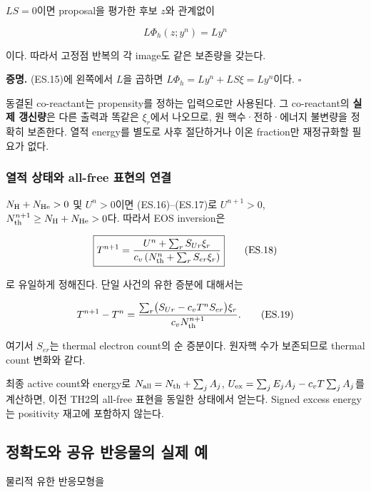 \documentclass[11pt,a4paper]{article}
\begin{document}
\(LS=0\)이면 proposal을 평가한 후보 \(z\)와 관계없이

\[
\boxed{
L\Phi_h(z;y^n)=Ly^n
}
\tag{ES.17}
\]

이다. 따라서 고정점 반복의 각 image도 같은 보존량을 갖는다.

\textbf{증명.} (ES.15)에 왼쪽에서 \(L\)을 곱하면 \(L\Phi_h=Ly^n+LS\xi=Ly^n\)이다. \(\square\)

동결된 co-reactant는 propensity를 정하는 입력으로만 사용된다. 그 co-reactant의 \textbf{실제 갱신량}은 다른 출력과 똑같은 \(\xi_r\)에서 나오므로, 원 핵수·전하·에너지 불변량을 정확히 보존한다. 열적 energy를 별도로 사후 절단하거나 이온 fraction만 재정규화할 필요가 없다.

\hypertarget{uxc5f4uxc801-uxc0c1uxd0dcuxc640-all-free-uxd45cuxd604uxc758-uxc5f0uxacb0}{%
\subsubsection{열적 상태와 all-free 표현의 연결}\label{uxc5f4uxc801-uxc0c1uxd0dcuxc640-all-free-uxd45cuxd604uxc758-uxc5f0uxacb0}}

\(N_{\rm H}+N_{\rm He}>0\) 및 \(U^n>0\)이면 (ES.16)--(ES.17)로 \(U^{n+1}>0\), \(N_{\rm th}^{n+1}\ge N_{\rm H}+N_{\rm He}>0\)다. 따라서 EOS inversion은

\[
\boxed{
T^{n+1}=\frac{U^n+\sum_r S_{Ur}\xi_r}
{c_v\left(N_{\rm th}^n+\sum_r S_{er}\xi_r\right)}
}
\tag{ES.18}
\]

로 유일하게 정해진다. 단일 사건의 유한 증분에 대해서는

\[
T^{n+1}-T^n
=
\frac{\sum_r
\bigl(S_{Ur}-c_vT^nS_{er}\bigr)\xi_r}
{c_vN_{\rm th}^{n+1}}.
\tag{ES.19}
\]

여기서 \(S_{er}\)는 thermal electron count의 순 증분이다. 원자핵 수가 보존되므로 thermal count 변화와 같다.

최종 active count와 energy로 \(N_{\rm all}=N_{\rm th}+\sum_jA_j\), \(U_{\rm ex}=\sum_jE_jA_j-c_vT\sum_jA_j\)를 계산하면, 이전 TH2의 all-free 표현을 동일한 상태에서 얻는다. Signed excess energy는 positivity 재고에 포함하지 않는다.

\hypertarget{uxc815uxd655uxb3c4uxc640-uxacf5uxc720-uxbc18uxc751uxbb3cuxc758-uxc2e4uxc81c-uxc608}{%
\subsection{정확도와 공유 반응물의 실제 예}\label{uxc815uxd655uxb3c4uxc640-uxacf5uxc720-uxbc18uxc751uxbb3cuxc758-uxc2e4uxc81c-uxc608}}

물리적 유한 반응모형을
\end{document}
